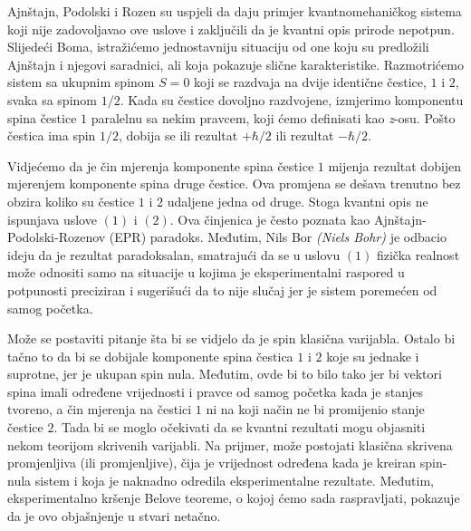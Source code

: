 Ajnštajn, Podolski i Rozen su uspjeli da daju primjer kvantnomehaničkog sistema koji
nije zadovoljavao ove uslove i zaključili da je kvantni opis prirode nepotpun.
Slijedeći Boma, istražićemo jednostavniju situaciju od one koju su predložili Ajnštajn
i njegovi saradnici, ali koja pokazuje slične karakteristike. Razmotri\' cemo sistem sa
ukupnim spinom $S = 0$ koji se razdvaja na dvije identične čestice, $1$ i $2$, svaka sa
spinom $1/2$. Kada su čestice dovoljno razdvojene, izmjerimo komponentu spina čestice $1$
paralelnu sa nekim pravcem, koji ćemo definisati kao {\it{z}}-osu. Pošto čestica ima spin
$1/2$, dobija se ili rezultat $+\hbar/2$ ili rezultat $-\hbar/2$.

Vidje\' cemo da je čin mjerenja komponente spina čestice $1$ mijenja
rezultat dobijen mjerenjem komponente spina druge čestice. Ova promjena se dešava
trenutno bez obzira koliko su čestice $1$ i $2$ udaljene jedna od druge. Stoga kvantni
opis ne ispunjava uslove $(1)$ i $(2)$. Ova činjenica je često poznata kao
Ajnštajn-Podolski-Rozenov (EPR) paradoks. Međutim, Nils Bor {\it{(Niels Bohr)}} je odbacio
ideju da je rezultat paradoksalan, smatrajući da se u uslovu $(1)$ fizička realnost
može odnositi samo na situacije u kojima je eksperimentalni raspored u potpunosti
preciziran i sugerišući da to nije slučaj jer je sistem poremećen od samog početka.

Može se postaviti pitanje šta bi se vidjelo da je spin klasična
varijabla. Ostalo bi tačno to da bi se dobijale komponente spina čestica $1$ i $2$ koje
su jednake i suprotne, jer je ukupan spin nula. Međutim, ovde bi to bilo tako jer bi
vektori spina imali određene vrijednosti i pravce od samog početka kada je stanjes tvoreno, a čin mjerenja na čestici $1$ ni na koji način ne bi promijenio stanje čestice
$2$. Tada bi se moglo očekivati da se kvantni rezultati mogu objasniti nekom teorijom skrivenih varijabli. Na prijmer, može postojati klasična skrivena promjenljiva (ili
promjenljive), čija je vrijednost određena kada je kreiran spin-nula sistem i koja je
naknadno odredila eksperimentalne rezultate. Međutim, eksperimentalno kršenje Belove
teoreme, o kojoj ćemo sada raspravljati, pokazuje da je ovo objašnjenje u stvari
netačno.